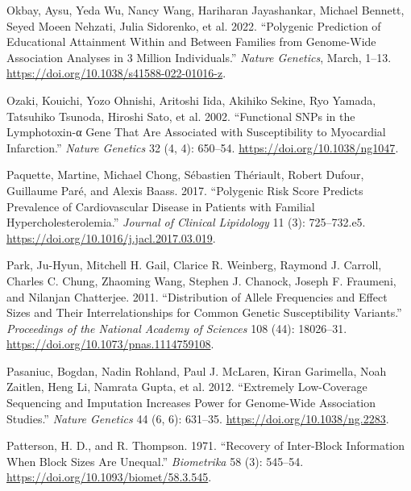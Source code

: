 \documentclass[
]{book}
\newlength{\cslhangindent}
\newlength{\cslentryspacingunit} %
\newenvironment{CSLReferences}[2] %
 {%
  \setlength{\parindent}{0pt}
  \ifodd #1
  \let\oldpar\par
  \def\par{\hangindent=\cslhangindent\oldpar}
  \fi
  \setlength{\parskip}{#2\cslentryspacingunit}
 }%
 {}
\begin{document}
\begin{CSLReferences}{1}{0}
\leavevmode{}%
Okbay, Aysu, Yeda Wu, Nancy Wang, Hariharan Jayashankar, Michael Bennett, Seyed Moeen Nehzati, Julia Sidorenko, et al. 2022. {``Polygenic Prediction of Educational Attainment Within and Between Families from Genome-Wide Association Analyses in 3 Million Individuals.''} \emph{Nature Genetics}, March, 1--13. \url{https://doi.org/10.1038/s41588-022-01016-z}.

\leavevmode{}%
Ozaki, Kouichi, Yozo Ohnishi, Aritoshi Iida, Akihiko Sekine, Ryo Yamada, Tatsuhiko Tsunoda, Hiroshi Sato, et al. 2002. {``Functional {SNPs} in the Lymphotoxin-α Gene That Are Associated with Susceptibility to Myocardial Infarction.''} \emph{Nature Genetics} 32 (4, 4): 650--54. \url{https://doi.org/10.1038/ng1047}.

\leavevmode{}%
Paquette, Martine, Michael Chong, Sébastien Thériault, Robert Dufour, Guillaume Paré, and Alexis Baass. 2017. {``Polygenic Risk Score Predicts Prevalence of Cardiovascular Disease in Patients with Familial Hypercholesterolemia.''} \emph{Journal of Clinical Lipidology} 11 (3): 725--732.e5. \url{https://doi.org/10.1016/j.jacl.2017.03.019}.

\leavevmode{}%
Park, Ju-Hyun, Mitchell H. Gail, Clarice R. Weinberg, Raymond J. Carroll, Charles C. Chung, Zhaoming Wang, Stephen J. Chanock, Joseph F. Fraumeni, and Nilanjan Chatterjee. 2011. {``Distribution of Allele Frequencies and Effect Sizes and Their Interrelationships for Common Genetic Susceptibility Variants.''} \emph{Proceedings of the National Academy of Sciences} 108 (44): 18026--31. \url{https://doi.org/10.1073/pnas.1114759108}.

\leavevmode{}%
Pasaniuc, Bogdan, Nadin Rohland, Paul J. McLaren, Kiran Garimella, Noah Zaitlen, Heng Li, Namrata Gupta, et al. 2012. {``Extremely Low-Coverage Sequencing and Imputation Increases Power for Genome-Wide Association Studies.''} \emph{Nature Genetics} 44 (6, 6): 631--35. \url{https://doi.org/10.1038/ng.2283}.

\leavevmode{}%
Patterson, H. D., and R. Thompson. 1971. {``Recovery of Inter-Block Information When Block Sizes Are Unequal.''} \emph{Biometrika} 58 (3): 545--54. \url{https://doi.org/10.1093/biomet/58.3.545}.


\end{CSLReferences}
\end{document}
